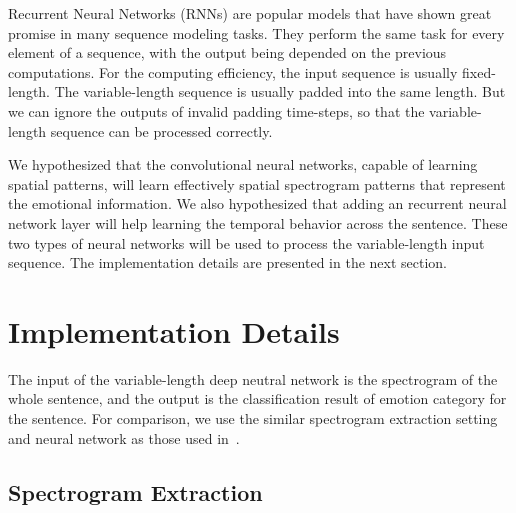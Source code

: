 \documentclass[a4paper]{article}
\begin{document}
Recurrent Neural Networks (RNNs) are popular models that have shown great promise in many sequence modeling tasks. They perform the same task for every element of a sequence, with the output being depended on the previous computations. For the computing efficiency, the input sequence is usually fixed-length. The variable-length sequence is usually padded into the same length. But we can ignore the outputs of invalid padding time-steps, so that the variable-length sequence can be processed correctly.

We hypothesized that the convolutional neural networks, capable of learning spatial patterns, will learn effectively spatial spectrogram patterns that represent the emotional information. We also hypothesized that adding an recurrent neural network layer will help learning the temporal behavior across the sentence. These two types of neural networks will be used to process the variable-length input sequence. The implementation details are presented in the next section.  

\section{Implementation Details}
\label{sec:implementation_details}

The input of the variable-length deep neutral network is the spectrogram of the whole sentence, and the output is the classification result of emotion category for the sentence. For comparison, we use the similar spectrogram extraction setting and neural network as those used in~\cite{satt2017}.

\subsection{Spectrogram Extraction}
\label{ssec:spectrogram_extraction}


\end{document}
